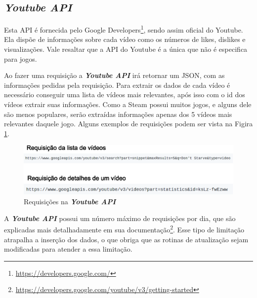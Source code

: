 \subsection*{\textit{Youtube API}}
Esta API é fornecida pelo Google Developers\footnote[6]{\url{https://developers.google.com/}}, sendo assim oficial do Youtube. Ela dispõe de informações sobre cada vídeo como os números de likes, dislikes e visualizações. Vale resaltar que a API do Youtube é a única que não é especifica para jogos.

Ao fazer uma requisição a \textit{\textbf{Youtube API}} irá retornar um JSON, com as informações pedidas pela requisição. Para extrair os dados de cada vídeo é necessário conseguir uma lista de vídeos mais relevantes, após isso com o id dos vídeos extrair suas informações. Como a Steam possui muitos jogos, e alguns dele são menos populares, serão extraídas informações apenas dos 5 vídeos mais relevantes daquele jogo. Alguns exemplos de requisições podem ser vista na Figira \ref{image:requiYou}.
\begin{figure} [H]
\centering
\includegraphics[scale=0.5]{figuras/requisicaoYou.eps}
\caption{Requisições na \textit{\textbf{Youtube API}}}
\label{image:requiYou}
\end{figure}

A \textit{\textbf{Youtube API}} possui um número máximo de requisições por dia, que são explicadas mais detalhadamente em sua documentação\footnote[7]{\url{https://developers.google.com/youtube/v3/getting-started}}. Esse tipo de limitação atrapalha a inserção dos dados, o que obriga que as rotinas de atualização sejam modificadas para atender a essa limitação.

